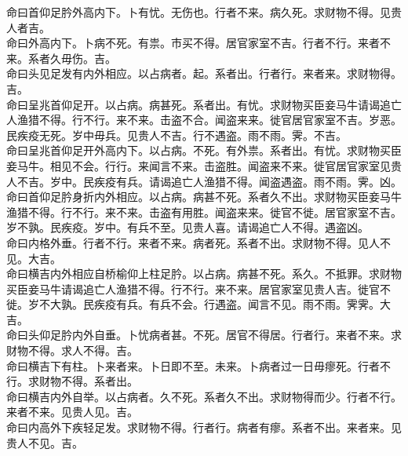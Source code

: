 \documentclass{zhvt-classic}
\begin{document}
\hspace*{2em}命曰首仰足肣外高内下。卜有忧。无伤也。行者不来。病久死。求财物不得。见贵人者吉。\\
\hspace*{2em}命曰外高内下。卜病不死。有祟。市买不得。居官家室不吉。行者不行。来者不来。系者久毋伤。吉。\\
\hspace*{2em}命曰头见足发有内外相应。以占病者。起。系者出。行者行。来者来。求财物得。吉。\\
\hspace*{2em}命曰呈兆首仰足开。以占病。病甚死。系者出。有忧。求财物买臣妾马牛请谒追亡人渔猎不得。行不行。来不来。击盗不合。闻盗来来。徙官居官家室不吉。岁恶。民疾疫无死。岁中毋兵。见贵人不吉。行不遇盗。雨不雨。霁。不吉。\\
\hspace*{2em}命曰呈兆首仰足开外高内下。以占病。不死。有外祟。系者出。有忧。求财物买臣妾马牛。相见不会。行行。来闻言不来。击盗胜。闻盗来不来。徙官居官家室见贵人不吉。岁中。民疾疫有兵。请谒追亡人渔猎不得。闻盗遇盗。雨不雨。霁。凶。\\
\hspace*{2em}命曰首仰足肣身折内外相应。以占病。病甚不死。系者久不出。求财物买臣妾马牛渔猎不得。行不行。来不来。击盗有用胜。闻盗来来。徙官不徙。居官家室不吉。岁不孰。民疾疫。岁中。有兵不至。见贵人喜。请谒追亡人不得。遇盗凶。\\
\hspace*{2em}命曰内格外垂。行者不行。来者不来。病者死。系者不出。求财物不得。见人不见。大吉。\\
\hspace*{2em}命曰横吉内外相应自桥榆仰上柱足肣。以占病。病甚不死。系久。不抵罪。求财物买臣妾马牛请谒追亡人渔猎不得。行不行。来不来。居官家室见贵人吉。徙官不徙。岁不大孰。民疾疫有兵。有兵不会。行遇盗。闻言不见。雨不雨。霁霁。大吉。\\
\hspace*{2em}命曰头仰足肣内外自垂。卜忧病者甚。不死。居官不得居。行者行。来者不来。求财物不得。求人不得。吉。\\
\hspace*{2em}命曰横吉下有柱。卜来者来。卜日即不至。未来。卜病者过一日毋瘳死。行者不行。求财物不得。系者出。\\
\hspace*{2em}命曰横吉内外自举。以占病者。久不死。系者久不出。求财物得而少。行者不行。来者不来。见贵人见。吉。\\
\hspace*{2em}命曰内高外下疾轻足发。求财物不得。行者行。病者有瘳。系者不出。来者来。见贵人不见。吉。\\
\end{document}
